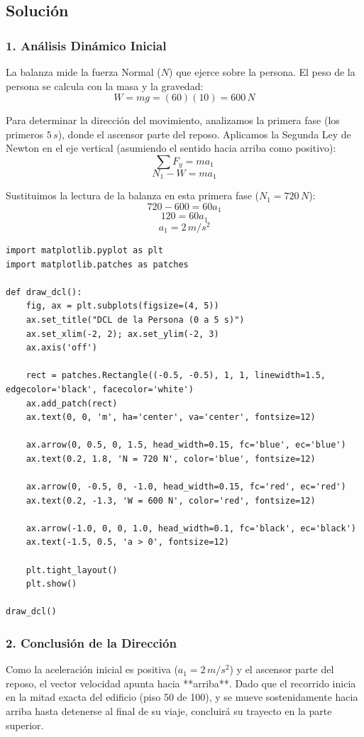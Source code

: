 \documentclass[12pt, a4paper]{article}
\begin{document}
\subsection*{Solución}

\subsubsection*{1. Análisis Dinámico Inicial}
La balanza mide la fuerza Normal ($N$) que ejerce sobre la persona. El peso de la persona se calcula con la masa y la gravedad:
$$ W = mg = (60)(10) = 600 \, \si{N} $$

Para determinar la dirección del movimiento, analizamos la primera fase (los primeros $5 \, \si{s}$), donde el ascensor parte del reposo.
Aplicamos la Segunda Ley de Newton en el eje vertical (asumiendo el sentido hacia arriba como positivo):
$$ \sum F_y = m a_1 $$
$$ N_1 - W = m a_1 $$

Sustituimos la lectura de la balanza en esta primera fase ($N_1 = 720 \, \si{N}$):
$$ 720 - 600 = 60 a_1 $$
$$ 120 = 60 a_1 $$
$$ a_1 = 2 \, \si{m/s^2} $$

\begin{lstlisting}
import matplotlib.pyplot as plt
import matplotlib.patches as patches

def draw_dcl():
    fig, ax = plt.subplots(figsize=(4, 5))
    ax.set_title("DCL de la Persona (0 a 5 s)")
    ax.set_xlim(-2, 2); ax.set_ylim(-2, 3)
    ax.axis('off')
    
    rect = patches.Rectangle((-0.5, -0.5), 1, 1, linewidth=1.5, edgecolor='black', facecolor='white')
    ax.add_patch(rect)
    ax.text(0, 0, 'm', ha='center', va='center', fontsize=12)
    
    ax.arrow(0, 0.5, 0, 1.5, head_width=0.15, fc='blue', ec='blue')
    ax.text(0.2, 1.8, 'N = 720 N', color='blue', fontsize=12)
    
    ax.arrow(0, -0.5, 0, -1.0, head_width=0.15, fc='red', ec='red')
    ax.text(0.2, -1.3, 'W = 600 N', color='red', fontsize=12)
    
    ax.arrow(-1.0, 0, 0, 1.0, head_width=0.1, fc='black', ec='black')
    ax.text(-1.5, 0.5, 'a > 0', fontsize=12)

    plt.tight_layout()
    plt.show()

draw_dcl()
\end{lstlisting}

\subsubsection*{2. Conclusión de la Dirección}
Como la aceleración inicial es positiva ($a_1 = 2 \, \si{m/s^2}$) y el ascensor parte del reposo, el vector velocidad apunta hacia **arriba**.
Dado que el recorrido inicia en la mitad exacta del edificio (piso 50 de 100), y se mueve sostenidamente hacia arriba hasta detenerse al final de su viaje, concluirá su trayecto en la parte superior.
\end{document}

